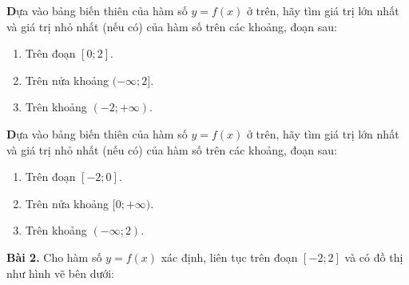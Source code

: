 \documentclass[12pt]{article}
\begin{document}
	\begin{btvang}
		\textbf Dựa vào bảng biến thiên của hàm số $y=f(x)$ ở trên, hãy tìm giá trị lớn nhất và giá trị nhỏ nhất (nếu có) của hàm số trên các khoảng, đoạn sau:
		\begin{enumerate}[label=\alph*)]
			\item Trên đoạn $[0; 2]$.
			\item Trên nửa khoảng $(-\infty; 2]$.
			\item Trên khoảng $(-2; +\infty)$.
		\end{enumerate}
	\end{btvang}
	
	\begin{btdo}
		\textbf Dựa vào bảng biến thiên của hàm số $y=f(x)$ ở trên, hãy tìm giá trị lớn nhất và giá trị nhỏ nhất (nếu có) của hàm số trên các khoảng, đoạn sau:
		\begin{enumerate}[label=\alph*)]
			\item Trên đoạn $[-2; 0]$.
			\item Trên nửa khoảng $[0; +\infty)$.
			\item Trên khoảng $(-\infty; 2)$.
		\end{enumerate}
	\end{btdo}
	
	\newpage
	
	\noindent\textbf{Bài 2.} Cho hàm số $y = f(x)$ xác định, liên tục trên đoạn $[-2; 2]$ và có đồ thị như hình vẽ bên dưới:
	
\end{document}
